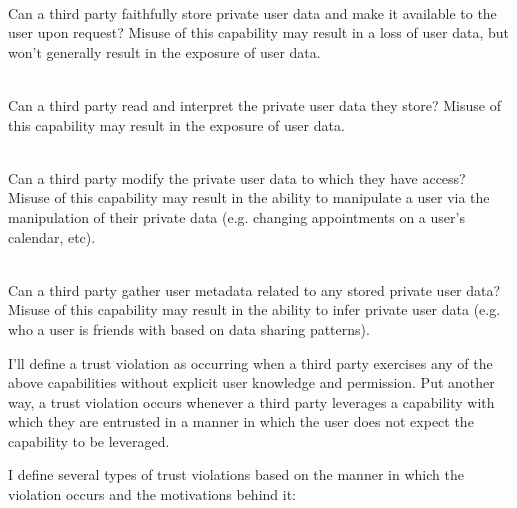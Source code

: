 \begin{packed_desc}
\item[Storage (S):] \hfill \\
  Can a third party faithfully store private user data and make it
  available to the user upon request? Misuse of this capability may
  result in a loss of user data, but won't generally result in the
  exposure of user data.
\item[Access (R):] \hfill \\
  Can a third party read and interpret the private user data they
  store? Misuse of this capability may result in the exposure of user
  data.
\item[Manipulation (W):] \hfill \\ 
  Can a third party modify the private user data to which they have
  access? Misuse of this capability may result in the ability to
  manipulate a user via the manipulation of their private data
  (e.g. changing appointments on a user's calendar, etc).
\item[Meta-analysis (M):] \hfill \\
  Can a third party gather user metadata related to any stored private
  user data? Misuse of this capability may result in the ability to
  infer private user data (e.g. who a user is friends with based on
  data sharing patterns).
\end{packed_desc}

I'll define a trust violation as occurring when a third party
exercises any of the above capabilities without explicit user
knowledge and permission. Put another way, a trust violation occurs
whenever a third party leverages a capability with which they are
entrusted in a manner in which the user does not expect the capability
to be leveraged.

I define several types of trust violations based on the manner in
which the violation occurs and the motivations behind it:

